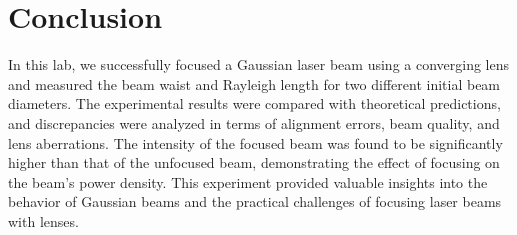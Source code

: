 \documentclass[12pt]{article}
\begin{document}
\section{Conclusion}
In this lab, we successfully focused a Gaussian laser beam using a converging lens and measured the beam waist and Rayleigh length for two different initial beam diameters. The experimental results were compared with theoretical predictions, and discrepancies were analyzed in terms of alignment errors, beam quality, and lens aberrations. The intensity of the focused beam was found to be significantly higher than that of the unfocused beam, demonstrating the effect of focusing on the beam's power density. This experiment provided valuable insights into the behavior of Gaussian beams and the practical challenges of focusing laser beams with lenses.
\end{document}
